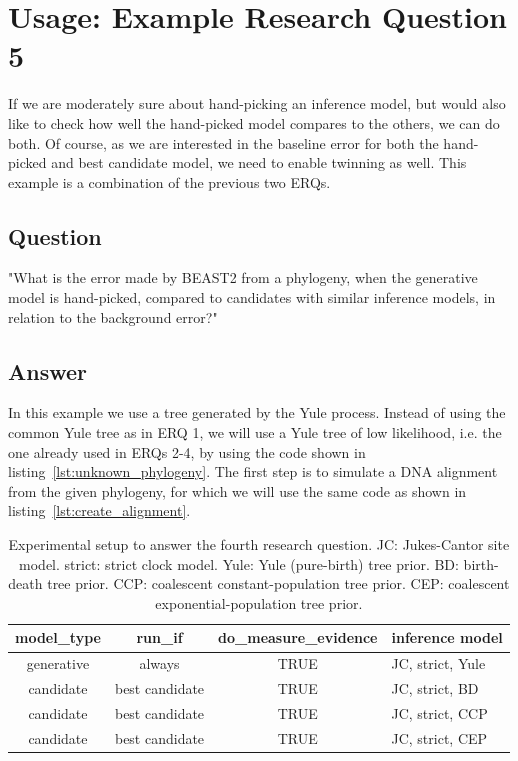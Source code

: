\documentclass{article}
\begin{document}
\section{Usage: Example Research Question 5}

If we are moderately sure about hand-picking an inference model,
but would also like to check how well the hand-picked model compares
to the others, we can do both. Of course, as we are interested in the
baseline error for both the hand-picked and best candidate model,
we need to enable twinning as well. This example is a combination
of the previous two ERQs. 

\subsection{Question}

"What is the error made by BEAST2 from a phylogeny, 
when the generative model is hand-picked, 
compared to candidates with similar inference models, 
in relation to the background error?"

\subsection{Answer}

In this example we use a tree generated by the Yule process.
Instead of using the common Yule tree as in ERQ 1, we will use
a Yule tree of low likelihood, 
i.e. the one already used in ERQs 2-4, 
by using the code shown in listing~\ref{lst:unknown_phylogeny}.
The first step is to simulate a DNA alignment 
from the given phylogeny, for which we will use the same code 
as shown in listing~\ref{lst:create_alignment}.

\begin{table}
  \begin{tabular}{ | c | c | c | l | }
    \hline
    \textbf{model\_type} & 
    \textbf{run\_if} & 
    \textbf{do\_measure\_evidence} & 
    \textbf{inference model} \\ 
    \hline
    generative & always         & TRUE & JC, strict, Yule \\
    candidate  & best candidate & TRUE & JC, strict, BD \\
    candidate  & best candidate & TRUE & JC, strict, CCP \\
    candidate  & best candidate & TRUE & JC, strict, CEP \\
    \hline
  \end{tabular}
  \caption{
    Experimental setup to answer the fourth research question.
    JC: Jukes-Cantor site model.
    strict: strict clock model.
    Yule: Yule (pure-birth) tree prior.
    BD: birth-death tree prior.
    CCP: coalescent constant-population tree prior.
    CEP: coalescent exponential-population tree prior.
  }
  \label{tab:experiment_5}
\end{table}
\end{document}
